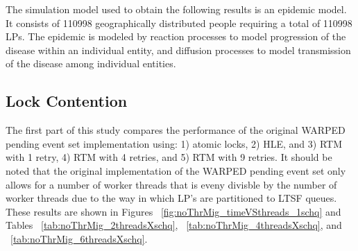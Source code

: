 \documentclass[a4paper]{article}
\begin{document}
\indent The simulation model used to obtain the following results is an epidemic
model.  It consists of 110998 geographically distributed people
requiring a total of 110998 LPs.  The epidemic is modeled by reaction processes
to model progression of the disease within an individual entity, and diffusion
processes to model transmission of the disease among individual entities.\par

%

\subsection{\textbf{Lock Contention}}

\indent
The first part of this study compares the performance of the original WARPED
pending event set implementation using: 1) atomic locks, 2) HLE, and 3) RTM with
1 retry, 4) RTM with 4 retries, and 5) RTM with 9 retries.  It should be noted
that the original implementation of the WARPED pending event set only allows for
a number of worker threads that is eveny divisble by the number of worker
threads due to the way in which LP's are partitioned to LTSF queues.  These
results are shown in Figures ~\ref{fig:noThrMig_timeVSthreads_1schq} and Tables
~\ref{tab:noThrMig_2threadsXschq}, ~\ref{tab:noThrMig_4threadsXschq}, and
~\ref{tab:noThrMig_6threadsXschq}.\par
\end{document}
